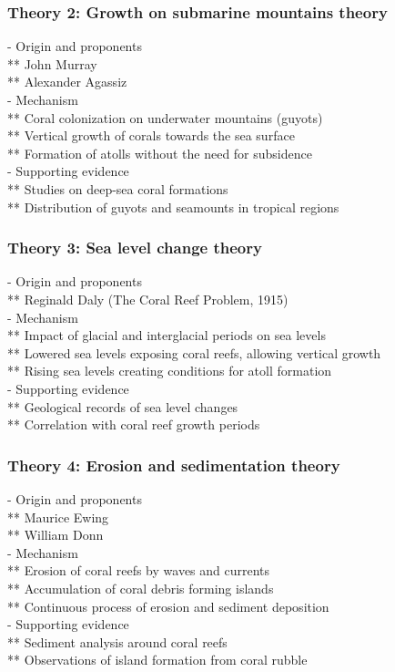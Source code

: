 \subsubsection{Theory 2: Growth on submarine mountains theory}
- Origin and proponents \\
** John Murray \\
** Alexander Agassiz \\
- Mechanism \\
** Coral colonization on underwater mountains (guyots) \\
** Vertical growth of corals towards the sea surface \\
** Formation of atolls without the need for subsidence \\
- Supporting evidence \\
** Studies on deep-sea coral formations \\
** Distribution of guyots and seamounts in tropical regions

\subsubsection{Theory 3: Sea level change theory}
- Origin and proponents \\
** Reginald Daly (The Coral Reef Problem, 1915) \\
- Mechanism \\
** Impact of glacial and interglacial periods on sea levels \\
** Lowered sea levels exposing coral reefs, allowing vertical growth \\
** Rising sea levels creating conditions for atoll formation \\
- Supporting evidence \\
** Geological records of sea level changes \\
** Correlation with coral reef growth periods

\subsubsection{Theory 4: Erosion and sedimentation theory}
- Origin and proponents \\
** Maurice Ewing \\
** William Donn \\
- Mechanism \\
** Erosion of coral reefs by waves and currents \\
** Accumulation of coral debris forming islands \\
** Continuous process of erosion and sediment deposition \\
- Supporting evidence \\
** Sediment analysis around coral reefs \\
** Observations of island formation from coral rubble


